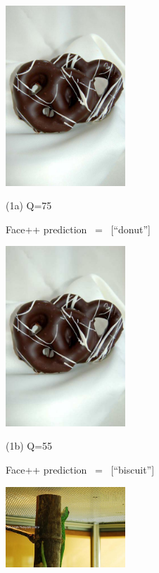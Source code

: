 \begin{figure}[!t]
	\begin{minipage}{0.4\linewidth}
		\centerline{\includegraphics[width=4.5cm, trim=0 150 0 150, clip]{figures/donut_q75.jpeg}}
		\centerline{(1a) Q=75}
		\centerline{Face++ prediction \ = \ [``donut'']}
		\vspace{0.4cm}
	\end{minipage}
	\hfill
	\begin{minipage}{0.4\linewidth}
		\centerline{\includegraphics[width=4.5cm, trim=0 150 0 150, clip]{figures/donut_q55.jpeg}}
		\centerline{(1b) Q=55}
		\centerline{Face++ prediction \ = \ [``biscuit'']}
		\vspace{0.4cm}
	\end{minipage}
	\vfill	
	\begin{minipage}{0.4\linewidth}
		\centerline{\includegraphics[width=4.5cm, trim=0 0 0 0]{figures/chameleon_q75.jpeg}}

\end{minipage}
\end{figure}
